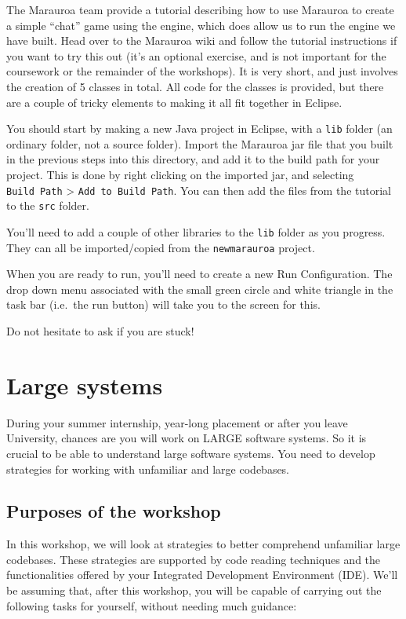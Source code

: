 \documentclass[
]{book}
\begin{document}
The Marauroa team provide a tutorial describing how to use Marauroa to create a simple ``chat'' game using the engine, which does allow us to run the engine we have built. Head over to the Marauroa wiki and follow the tutorial instructions if you want to try this out (it's an optional exercise, and is not important for the coursework or the remainder of the workshops). It is very short, and just involves the creation of 5 classes in total. All code for the classes is provided, but there are a couple of tricky elements to making it all fit together in Eclipse.

You should start by making a new Java project in Eclipse, with a \texttt{lib} folder (an ordinary folder, not a source folder). Import the Marauroa jar file that you built in the previous steps into this directory, and add it to the build path for your project. This is done by right clicking on the imported jar, and selecting \texttt{Build\ Path} \textgreater{} \texttt{Add\ to\ Build\ Path}. You can then add the files from the tutorial to the \texttt{src} folder.

You'll need to add a couple of other libraries to the \texttt{lib} folder as you progress. They can all be imported/copied from the \texttt{newmarauroa} project.

When you are ready to run, you'll need to create a new Run Configuration. The drop down menu associated with the small green circle and white triangle in the task bar (i.e.~the run button) will take you to the screen for this.

Do not hesitate to ask if you are stuck!

\hypertarget{understanding}{%
\chapter{Large systems}\label{understanding}}

During your summer internship, year-long placement or after you leave University, chances are you will work on LARGE software systems. So it is crucial to be able to understand large software systems. You need to develop strategies for working with unfamiliar and large codebases.

\hypertarget{purposes}{%
\section{Purposes of the workshop}\label{purposes}}

In this workshop, we will look at strategies to better comprehend unfamiliar large codebases. These strategies are supported by code reading techniques \citep{codereading} and the functionalities offered by your Integrated Development Environment (IDE). We'll be assuming that, after this workshop, you will be capable of carrying out the following tasks for yourself, without needing much guidance:
\end{document}
